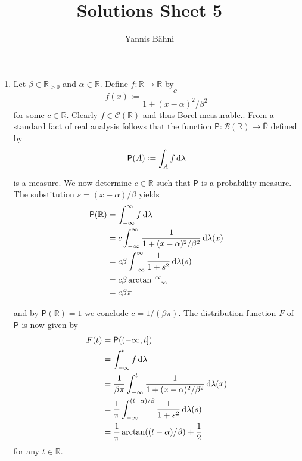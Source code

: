 
\DeclareMathOperator{\Poi}{Poi}
\DeclareMathOperator{\Bin}{Bin}
\DeclareMathOperator{\Var}{Var}
\newcommand\Psf{\mathsf{P}}
\newcommand\Esf{\mathsf{E}}


\title{Solutions Sheet 5}
\author{Yannis B\"{a}hni}
\address[Yannis B\"{a}hni]{University of Zurich, R\"{a}mistrasse 71, 8006 Zurich}


\maketitle
\thispagestyle{fancy}
\begin{enumerate}[label = \textbf{Exercise \arabic*.},wide = 0pt, itemsep=1.5ex]
	\item Let $\beta \in \mathbb{R}_{> 0}$ and $\alpha \in \mathbb{R}$. Define $f: \mathbb{R} \to \mathbb{R}$ by 
		\begin{equation}
			f(x) := \frac{c}{1 + (x - \alpha)^2/\beta^2}
		\end{equation}
		\noindent for some $c \in \mathbb{R}$. Clearly $f \in \mathscr{C}(\mathbb{R})$ and thus Borel-measurable.. From a standard fact of real analysis follows that the function $\Psf: \mathscr{B}(\mathbb{R}) \to \overline{\mathbb{R}}$ defined by
		\begin{equation}
			\Psf(A) := \int_A f \d \lambda
		\end{equation}

		\noindent is a measure. We now determine $c \in \mathbb{R}$ such that $\Psf$ is a probability measure. The substitution $s = (x - \alpha)/\beta$ yields
		\begin{align*}
			\Psf(\mathbb{R}) &= \int_{- \infty}^\infty f \d \lambda\\ &= c\int_{-\infty}^\infty\frac{1}{1 + (x - \alpha)^2/\beta^2}\d \lambda(x)\\
			&= c\beta\int_{-\infty}^\infty\frac{1}{1 + s^2}\d \lambda(s)\\ 
			&= c\beta \arctan \vert_{- \infty}^\infty\\
			&= c\beta \pi
		\end{align*}

		\noindent and by $\Psf(\mathbb{R}) = 1$ we conclude $c = 1/(\beta \pi)$. The distribution function $F$ of $\Psf$ is now given by
		\begin{align*}
			F(t) &= \Psf(\intoc{-\infty,t})\\
			&= \int_{-\infty}^t f\d \lambda\\
			&= \frac{1}{\beta \pi}\int_{-\infty}^t\frac{1}{1 + (x - \alpha)^2/\beta^2}\d \lambda(x)\\
			&= \frac{1}{\pi}\int_{-\infty}^{(t - \alpha)/\beta}\frac{1}{1 + s^2}\d \lambda(s)\\
			&= \frac{1}{\pi}\arctan((t - \alpha)/\beta) + \frac{1}{2}
		\end{align*}
		\noindent for any $t \in \mathbb{R}$.


\end{enumerate}
